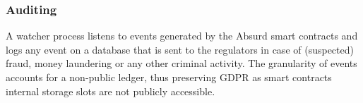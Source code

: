 \documentclass[a4paper,10 pt]{article}
\theoremstyle{definition}
\begin{document}
\subsubsection{Auditing}\label{auditingSub}
A watcher process listens to events generated by the Absurd smart contracts and logs any event on a database that is sent to the regulators in case of (suspected) fraud, money laundering or any other criminal activity. The granularity of events accounts for a non-public ledger, thus preserving GDPR as smart contracts internal storage slots are not publicly accessible.
\end{document}
